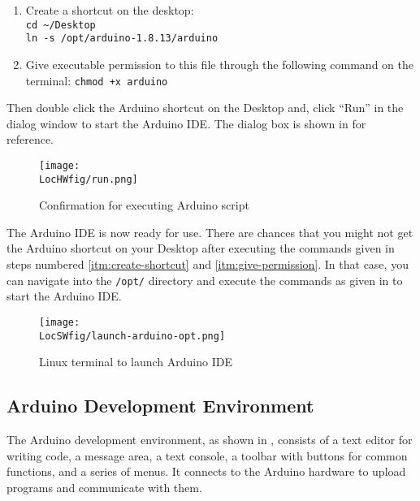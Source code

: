\begin{enumerate}
      \item \label{itm:create-shortcut} Create a shortcut on the desktop:\\
            {\tt cd {\large \textasciitilde}/Desktop\\
            ln -s /opt/arduino-1.8.13/arduino}
      \item \label{itm:give-permission} Give executable permission to this file through the following
            command on the terminal: {\tt chmod +x arduino}
            
\end{enumerate}
Then double click the Arduino shortcut on the Desktop and, click ``Run''
in the dialog window to start the Arduino IDE. The dialog box is shown in  for reference.
\begin{figure}
      \centering
      \texttt{[image: \\LocHWfig/run.png]}
      \caption{Confirmation for executing Arduino script}
      \label{ard-lin-run}
\end{figure}
The Arduino IDE is now ready for use. There are chances that you might not 
get the Arduino shortcut on your Desktop after executing the commands given in 
steps numbered \ref{itm:create-shortcut} and \ref{itm:give-permission}. 
In that case, you can navigate into the {\tt /opt/} directory and execute the 
commands as given in  to start the Arduino IDE. 

\begin{figure}
      \centering
      \texttt{[image: \\LocSWfig/launch-arduino-opt.png]}
      \caption{Linux terminal to launch Arduino IDE}
      \label{arduino-opt}
\end{figure}


\subsection{Arduino Development Environment}
\label{sec:Arduino-IDE}
The Arduino development environment, as shown in ,
consists of 
a text editor for writing code, a message area, a text console, a
toolbar with buttons for common functions, and a series of menus. It
connects to the Arduino hardware to upload programs and communicate
with them.

